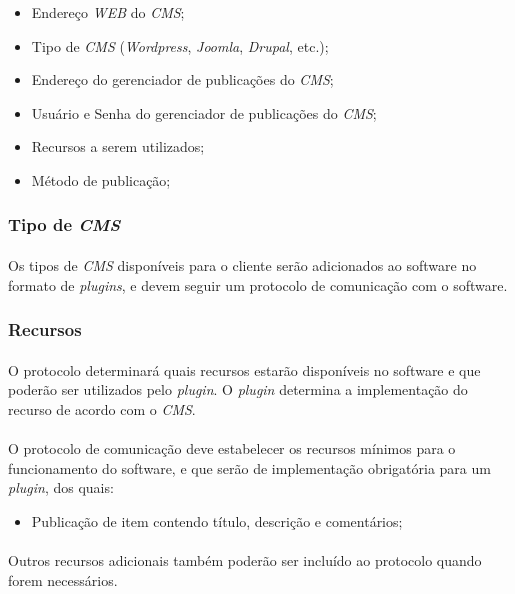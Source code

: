\documentclass[a4paper,12pt]{article}
\def\cms{\emph{CMS}}
\def\plugin{\emph{plugin}}
\begin{document}
\begin{itemize}
\item Endereço \emph{WEB} do \cms{};
\item Tipo de \cms{} (\emph{Wordpress}, \emph{Joomla}, \emph{Drupal}, etc.);
\item Endereço do gerenciador de publicações do \cms{};
\item Usuário e Senha do gerenciador de publicações do \cms{};
\item Recursos a serem utilizados;
\item Método de publicação;
\end{itemize}

\subsubsection{Tipo de \cms{}}

\paragraph{}
Os tipos de \cms{} disponíveis para o cliente serão adicionados ao software no formato de \emph{plugins}, e devem seguir um protocolo de comunicação com o software.

\subsubsection{Recursos}

\paragraph{}
O protocolo determinará quais recursos estarão disponíveis no software e que poderão ser utilizados pelo \plugin{}. O \plugin{} determina a implementação do recurso de acordo com o \cms{}.
\paragraph{}
O protocolo de comunicação deve estabelecer os recursos mínimos para o funcionamento do software, e que serão de implementação obrigatória para um \plugin{}, dos quais:

\begin{itemize}
\item Publicação de item contendo título, descrição e comentários;
\end{itemize}

\paragraph{}
Outros recursos adicionais também poderão ser incluído ao protocolo quando forem necessários.
\end{document}
